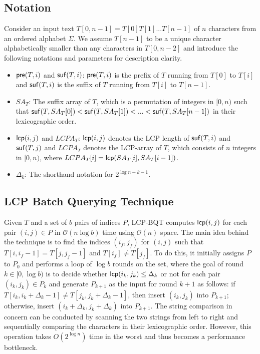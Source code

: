 \documentclass[10pt,journal,compsoc]{IEEEtran}
\begin{document}
\begin{CJK*}{GBK}{song}
\subsection{Notation}\label{subsec:basic_notations}

Consider an input text $T[0,n-1] =T[0]T[1]...T[n-1]$ of $n$ characters from an ordered alphabet $\Sigma$. We assume $T[n-1]$ to be a unique character alphabetically smaller than any characters in $T[0,n-2]$ and introduce the following notations and parameters for description clarity.

{\color{red}
\begin{itemize}
\item ${\sf pre}(T,i)$ and ${\sf suf}(T,i)$: ${\sf pre}(T,i)$ is the prefix of $T$ running from $T[0]$ to $T[i]$ and ${\sf suf}(T,i)$ is the suffix of $T$ running from $T[i]$ to $T[n-1]$.
\item $SA_T$: The suffix array of $T$, which is a permutation of integers in $[0,n)$ such that ${\sf suf}(T,SA_T[0])<{\sf suf}(T,SA_T[1])<...<{\sf suf}(T,SA_T[n-1])$ in their lexicographic order.
\item ${\sf lcp}(i,j)$ and $LCPA_T$: ${\sf lcp}(i,j)$ denotes the LCP length of ${\sf suf}(T,i)$ and ${\sf suf}(T,j)$ and $LCPA_T$ denotes the LCP-array of $T$, which consists of $n$ integers in $[0,n)$, where $LCPA_T[i]= {\sf lcp}(SA_T[i],SA_T[i-1])$.
\item $\Delta_{k}$: The shorthand notation for $2^{\log n - k - 1}$.
\end{itemize}
}

\subsection{LCP Batch Querying Technique}\label{subsec:lcp_batch_querying_technique}

Given $T$ and a set of $b$ pairs of indices $P$, LCP-BQT computes ${\sf lcp}(i,j)$ for each pair $(i,j)\in P$ in $\mathcal{O}(n\log b)$ time using $\mathcal{O}(n)$ space. The main idea behind the technique is to find the indices $(i_{f}, j_{f})$ for $(i,j)$ such that $T[i,i_{f}-1]=T[j,j_{f}-1]$ and $T[i_{f}] \neq T[j_{f}]$. To do this, it initially assigns $P$ to $P_0$ and performs a loop of $\log b$ rounds on the set, where the goal of round $k\in [0,\log b)$ is to decide whether ${\sf lcp}(i_k,j_k) \le \Delta_k$ or not for each pair $(i_k,j_k)\in P_k$ and generate $P_{k+1}$ as the input for round $k+1$ as follows: if $T[i_k,i_k+\Delta_k-1] \neq T[j_k,j_k+\Delta_k-1]$, then insert $(i_k,j_k)$ into $P_{k+1}$; otherwise, insert $(i_k+\Delta_k,j_k+\Delta_k)$ into $P_{k+1}$. The string comparison in concern can be conducted by scanning the two strings from left to right and sequentially comparing the characters in their lexicographic order. However, this operation takes $O(2^{\log n})$ time in the worst and thus becomes a performance bottleneck.


\end{CJK*}
\end{document}
